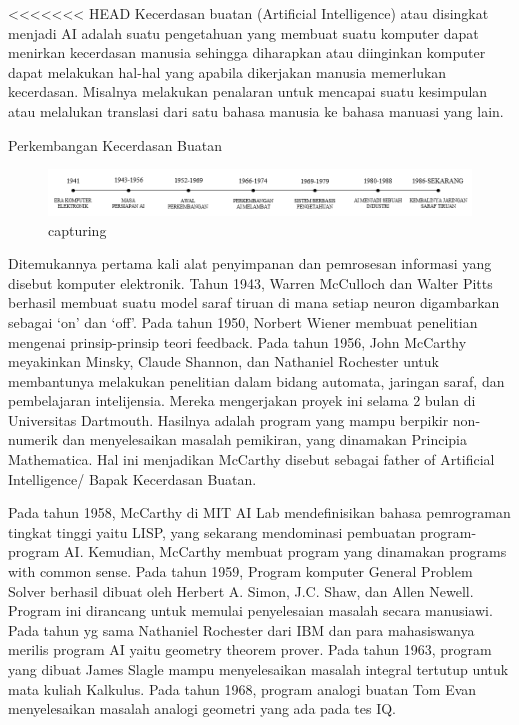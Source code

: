 <<<<<<< HEAD
Kecerdasan buatan (Artificial Intelligence) atau disingkat menjadi AI adalah suatu pengetahuan yang membuat suatu komputer dapat menirkan  kecerdasan manusia sehingga diharapkan atau diinginkan komputer dapat melakukan hal-hal yang apabila dikerjakan manusia memerlukan kecerdasan. Misalnya melakukan penalaran untuk mencapai suatu kesimpulan atau melalukan translasi dari satu bahasa manusia ke bahasa manuasi yang lain.


\item Perkembangan Kecerdasan Buatan
\begin{figure}[ht]
\centering
\includegraphics[scale=0.5]{figures/Screenshot_1.png}
\caption{capturing}
\label{perkembangan}
\end{figure}

Ditemukannya pertama kali alat penyimpanan dan pemrosesan informasi yang disebut komputer elektronik. Tahun 1943, Warren McCulloch dan Walter Pitts berhasil membuat suatu model saraf tiruan di mana setiap neuron digambarkan sebagai ‘on’ dan ‘off’. Pada tahun 1950, Norbert Wiener membuat penelitian mengenai prinsip-prinsip teori feedback. Pada tahun 1956, John McCarthy meyakinkan Minsky, Claude Shannon, dan Nathaniel Rochester untuk membantunya melakukan penelitian dalam bidang automata, jaringan saraf, dan pembelajaran intelijensia. Mereka mengerjakan proyek ini selama 2 bulan di Universitas Dartmouth. Hasilnya adalah program yang mampu berpikir non-numerik dan menyelesaikan masalah pemikiran, yang dinamakan Principia Mathematica. Hal ini menjadikan McCarthy disebut sebagai father of Artificial Intelligence/ Bapak Kecerdasan Buatan.

Pada tahun 1958, McCarthy di MIT AI Lab mendefinisikan bahasa pemrograman tingkat tinggi yaitu LISP, yang sekarang mendominasi pembuatan program-program AI. Kemudian, McCarthy membuat program yang dinamakan programs with common sense. Pada tahun 1959, Program komputer General Problem Solver berhasil dibuat oleh Herbert A. Simon, J.C. Shaw, dan Allen Newell. Program ini dirancang untuk memulai penyelesaian masalah secara manusiawi. Pada tahun yg sama Nathaniel Rochester dari IBM dan para mahasiswanya merilis program AI yaitu geometry theorem prover. Pada tahun 1963, program yang dibuat James Slagle mampu menyelesaikan masalah integral tertutup untuk mata kuliah Kalkulus. Pada tahun 1968, program analogi buatan Tom Evan menyelesaikan masalah analogi geometri yang ada pada tes IQ.

